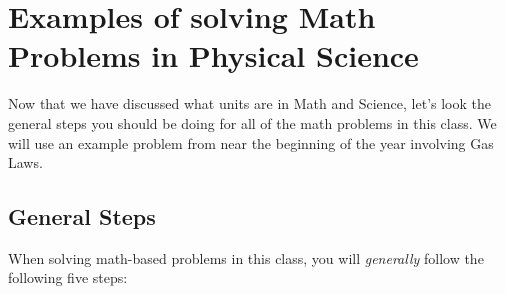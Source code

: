\documentclass[../../main.tex]{subfiles}
\begin{document}
\section{Examples of solving Math Problems in Physical Science}

Now that we have discussed what units are in Math and Science, let's look the general steps you should be doing for all of the math problems in this class.  We will use an example problem from near the beginning of the year involving Gas Laws.


\subsection{General Steps}
When solving math-based problems in this class, you will \emph{generally} follow the following five steps:
\end{document}
